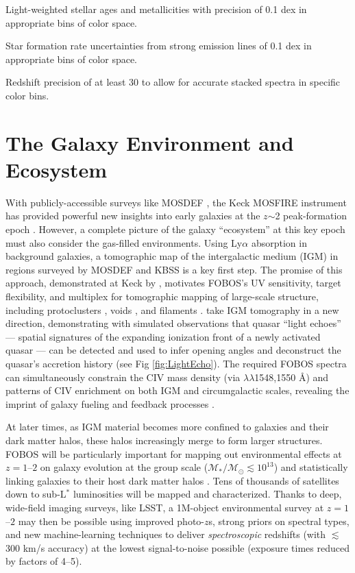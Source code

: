 \documentclass[11pt,a4paper,twoside,onecolumn,openany,final,oldfontcommands]{memoir}
\begin{document}
\begin{sciencerequirement}

\reqitem Light-weighted stellar ages and metallicities with precision of 0.1 dex in appropriate bins of color space.

\reqitem Star formation rate uncertainties from strong emission lines of 0.1 dex in appropriate bins of color space.

\reqitem Redshift precision of at least 30 \kms{} to allow for accurate stacked spectra in specific color bins.

\end{sciencerequirement}


\section{The Galaxy Environment and Ecosystem}
\label{sci:ecosystem}

With publicly-accessible surveys like MOSDEF \citep{kriek15}, the Keck MOSFIRE instrument has provided powerful new insights into early galaxies at the $z$$\sim$2 peak-formation epoch \citep[also see KBSS,][]{steidel14}. However, a complete picture of the galaxy ``ecosystem'' at this key epoch must also consider the gas-filled environments. Using Ly$\alpha$ absorption in background galaxies, a tomographic map of the intergalactic medium (IGM) in regions surveyed by MOSDEF and KBSS is a key first step. The promise of this approach, demonstrated at Keck by \citet{lee14}, motivates FOBOS's UV sensitivity, target flexibility, and multiplex for tomographic mapping of large-scale structure, including protoclusters \citep{lee16,kartaltepe19}, voids \citep{krolewski18}, and filaments \citep{horowitz19}. \citet{2018arXiv181005156S} take IGM tomography in a new direction, demonstrating with simulated observations that quasar ``light echoes'' --- spatial signatures of the expanding ionization front of a newly activated quasar --- can be detected and used to infer opening angles and deconstruct the quasar's accretion history (see Fig \ref{fig:LightEcho}). The required FOBOS spectra can simultaneously constrain the CIV mass density (via $\lambda\lambda$1548,1550 \AA) and patterns of CIV enrichment on both IGM and circumgalactic scales, revealing the imprint of galaxy fueling and feedback processes \citep[e.g.,][]{tumlinson17}.

At later times, as IGM material becomes more confined to galaxies and their dark matter halos, these halos increasingly merge to form larger structures.  FOBOS will be particularly important for mapping out environmental effects at $z=1$--$2$ on galaxy evolution at the group scale ($\mathcal{M_\ast/M_\odot} \lesssim 10^{13}$) and statistically linking galaxies to their host dark matter halos \citep{behroozi19}.  Tens of thousands of satellites down to sub-L$^*$ luminosities will be mapped and characterized. Thanks to deep, wide-field imaging surveys, like LSST, a 1M-object environmental survey at $z=1$--$2$ may then be possible using improved photo-$z$s, strong priors on spectral types, and new machine-learning techniques to deliver {\it spectroscopic} redshifts (with $\lesssim$300 km/s accuracy) at the lowest signal-to-noise possible (exposure times reduced by factors of 4--5).
\end{document}
